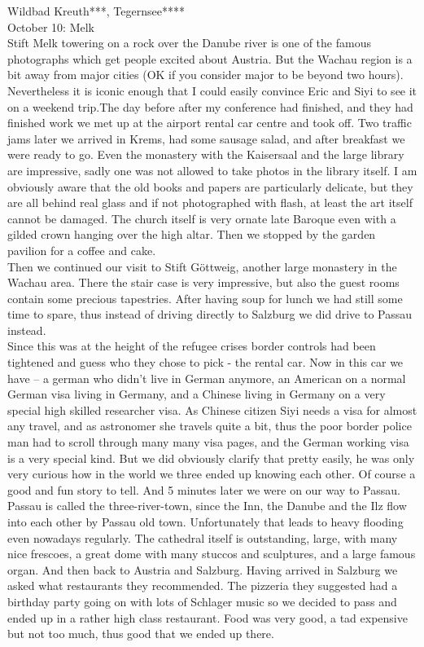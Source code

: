 Wildbad Kreuth***, Tegernsee****\\

October 10: Melk\\
Stift Melk towering on a rock over the Danube river is one of the famous photographs which get people excited about Austria. But the Wachau region is a bit away from major cities (OK if you consider major to be beyond two hours). Nevertheless it is iconic enough that I could easily convince Eric and Siyi to see it on a weekend trip.The day before after my conference had finished, and they had finished work we met up at the airport rental car centre and took off. Two traffic jams later we arrived in Krems, had some sausage salad, and after breakfast we were ready to go. Even the monastery with the Kaisersaal and the large library are impressive, sadly one was not allowed to take photos in the library itself. I am obviously aware that the old books and papers are particularly delicate, but they are all behind real glass and if not photographed with flash, at least the art itself cannot be damaged. The church itself is very ornate late Baroque even with a gilded crown hanging over the high altar. Then we stopped by the garden pavilion for a coffee and cake.\\
 Then we continued our visit to Stift G\"ottweig, another large monastery in the Wachau area. There the stair case is very impressive, but also the guest rooms contain some precious tapestries. After having soup for lunch we had still some time to spare, thus instead of driving directly to Salzburg we did drive to Passau instead.\\
 Since this was at the height of the refugee crises border controls had been tightened and guess who they chose to pick - the rental car. Now in this car we have -- a german who didn't live in German anymore, an American on a normal German visa living in Germany, and a Chinese living in Germany on a very special high skilled researcher visa. As Chinese citizen Siyi needs a visa for almost any travel, and as astronomer she travels quite a bit, thus the poor border police man had to scroll through many many visa pages, and the German working visa is a very special kind. But we did obviously clarify that pretty easily, he was only very curious how in the world we three ended up knowing each other. Of course a good and fun story to tell. And 5 minutes later we were on our way to Passau.\\
 Passau is called the three-river-town, since the Inn, the Danube and the Ilz flow into each other by Passau old town. Unfortunately that leads to heavy flooding even nowadays regularly. The cathedral itself is outstanding, large, with many nice frescoes, a great dome with many stuccos and sculptures, and a large famous organ. And then back to Austria and Salzburg. Having arrived in Salzburg we asked what restaurants they recommended. The pizzeria they suggested had a birthday party going on with lots of Schlager music so we decided to pass and ended up in a rather high class restaurant. Food was very good, a tad expensive but not too much, thus good that we ended up there.

